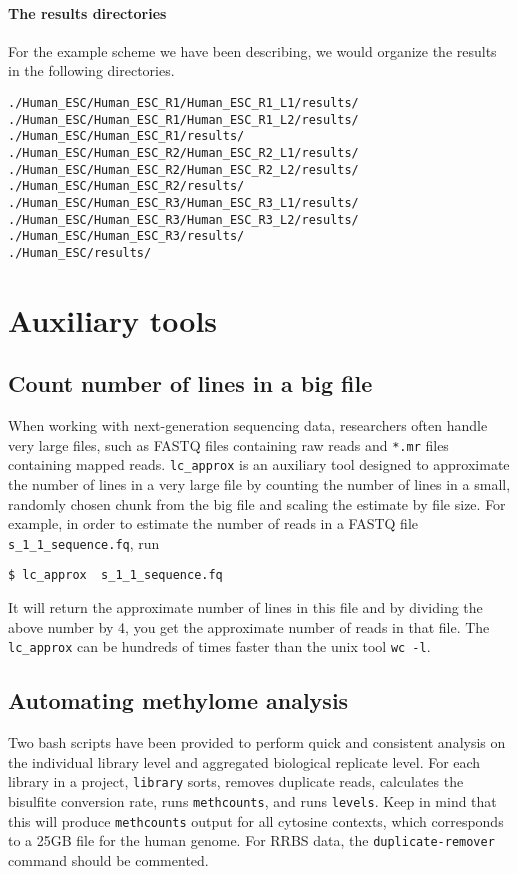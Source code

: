 \documentclass[10pt]{article}
\newcommand{\prog}[1]{\texttt{#1}}
\newcommand{\fn}[1]{\texttt{#1}}
\begin{document}
\paragraph{The results directories}
For the example scheme we have been describing, we would organize the
results in the following directories.
\begin{verbatim}
./Human_ESC/Human_ESC_R1/Human_ESC_R1_L1/results/
./Human_ESC/Human_ESC_R1/Human_ESC_R1_L2/results/
./Human_ESC/Human_ESC_R1/results/
./Human_ESC/Human_ESC_R2/Human_ESC_R2_L1/results/
./Human_ESC/Human_ESC_R2/Human_ESC_R2_L2/results/
./Human_ESC/Human_ESC_R2/results/
./Human_ESC/Human_ESC_R3/Human_ESC_R3_L1/results/
./Human_ESC/Human_ESC_R3/Human_ESC_R3_L2/results/
./Human_ESC/Human_ESC_R3/results/
./Human_ESC/results/
\end{verbatim}


\section{Auxiliary tools}
\label{sec:auxiliary-tools}

\subsection{Count number of lines in a big file}
\label{sec:count-number-lines}

When working with next-generation sequencing data, researchers often
handle very large files, such as FASTQ files containing raw reads
and \fn{*.mr} files containing mapped reads. \prog{lc\_approx} is
an auxiliary tool designed to approximate the number of lines in a
very large file by counting the number of lines in a small, randomly
chosen chunk from the big file and scaling the estimate by file size.
For example, in order to estimate the number of reads in a FASTQ file
\fn{s\_1\_1\_sequence.fq}, run
\begin{verbatim}
$ lc_approx  s_1_1_sequence.fq
\end{verbatim}
It will return the approximate number of lines in this file and by
dividing the above number by 4, you get the approximate number of
reads in that file. The \prog{lc\_approx} can be hundreds of times
faster than the unix tool \prog{wc -l}.

\subsection{Automating methylome analysis}
\label{sec:automate-library-level}
Two bash scripts have been provided to perform quick and consistent analysis
on the individual library level and aggregated biological replicate level.
For each library in a project, \prog{library} sorts, removes duplicate
reads, calculates the bisulfite conversion rate, runs \prog{methcounts}, and
runs \prog{levels}. Keep in mind that this will produce \prog{methcounts}
output for all cytosine contexts, which corresponds to a 25GB file for the
human genome. For RRBS data, the \prog{duplicate-remover} command should
be commented.
\end{document}
